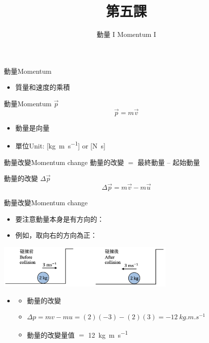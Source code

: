 \documentclass[beamer=true]{standalone}
\title{第五課}
\author{動量 I Momentum I}
\institute{全年班}
\date{}
\begin{document}
\frame{\titlepage}



\begin{frame}{動量Momentum}
    \begin{itemize}
        \item 質量和速度的乘積
    \end{itemize}
    \begin{alertblock}
        {動量Momentum $\vec{p}$}
        \begin{equation}
            \vec{p}=m\vec{v}
        \end{equation}
    \end{alertblock}
    \begin{itemize}
        \item 動量是向量
        \item 單位Unit: [\unit{kg.m.s^{-1}}] or [\unit{N.s}]
    \end{itemize}
\end{frame}

\begin{frame}{動量改變Momentum change}
    動量的改變 $=$ 最終動量 $–$ 起始動量
    \begin{exampleblock}
        {動量的改變 $\Delta \vec{p}$}
        \begin{equation}
            \Delta\vec{p}=m\vec{v}-m\vec{u}
        \end{equation}
    \end{exampleblock}
\end{frame}

\begin{frame}{動量改變Momentum change}
    \begin{itemize}
        \item 要注意動量本身是有方向的：
        \item 例如，取向右的方向為正：
    \end{itemize}
    {\par\centering
    \includegraphics[width=0.66\textwidth]{assets/e26d5e2e.png}
    \par}
    \begin{itemize}
        \item[]\begin{itemize}
                  \item 動量的改變
                  \item[] $\Delta p=mv-mu=(2)(-3)-(2)(3)=\qty{-12}{kg.m.s^{-1}}$
                  \item 動量的改變量值  $=$ \qty{12}{kg.m.s^{-1}}
              \end{itemize}
    \end{itemize}
\end{frame}
\end{document}
